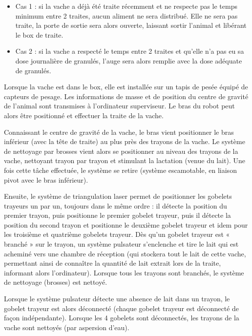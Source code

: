 \begin{itemize}
 \item Cas 1 : si la vache a déjà été traite récemment et ne respecte pas le temps minimum entre 2 traites, aucun aliment ne sera distribué. Elle ne sera pas traite, la porte de sortie sera alors ouverte, laissant sortir l’animal et libérant le box de traite.
 \item Cas 2 : si la vache a respecté le temps entre 2 traites et qu’elle n’a pas eu sa dose journalière de granulés, l’auge sera alors remplie avec la dose adéquate de granulés.
\end{itemize} 

Lorsque la vache est dans le box, elle est installée sur un tapis de pesée équipé de capteurs de pesage. Les informations de masse et de position du centre de gravité de l’animal sont transmises à l’ordinateur superviseur. Le bras du robot peut alors être positionné et effectuer la traite de la vache.

Connaissant le centre de gravité de la vache, le bras vient positionner le bras inférieur (avec la tête de traite) au plus près des trayons de la vache. Le système de nettoyage par brosses vient alors se positionner au niveau des trayons de la vache, nettoyant trayon par trayon et stimulant la lactation (venue du lait). Une fois cette tâche effectuée, le système se retire (système escamotable, en liaison pivot avec le bras inférieur).

Ensuite, le système de triangulation laser permet de positionner les gobelets trayeurs un par un, toujours dans le même ordre : il détecte la position du premier trayon, puis positionne le premier gobelet trayeur, puis il détecte la position du second trayon et positionne le deuxième gobelet trayeur et idem pour les troisième et quatrième gobelets trayeur. Dès qu’un gobelet trayeur est « branché » sur le trayon, un système pulsateur s’enclenche et tire le lait qui est acheminé vers une chambre de réception (qui stockera tout le lait de cette vache, permettant ainsi de connaître la quantité de lait extrait lors de la traite, informant alors l’ordinateur). Lorsque tous les trayons sont branchés, le système de nettoyage (brosses) est nettoyé.

Lorsque le système pulsateur détecte une absence de lait dans un trayon, le gobelet trayeur est alors déconnecté (chaque gobelet trayeur est déconnecté de façon indépendante). Lorsque les 4 gobelets sont déconnectés, les trayons de la vache sont nettoyés (par aspersion d’eau).

